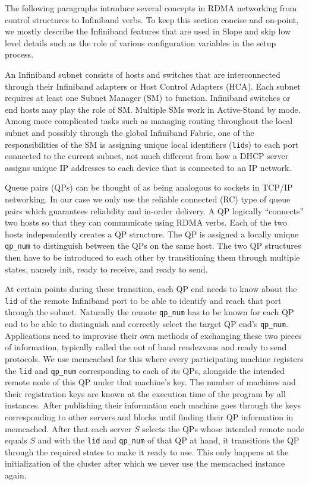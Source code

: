 The following paragraphs introduce several concepts in RDMA
networking from control structures to Infiniband verbs. To keep this section
concise and on-point, we mostly describe the Infiniband features that are used
in Slope and skip low level details such as the role of various configuration
variables in the setup process.

An Infiniband subnet consists of hosts and switches that are interconnected
through their Infiniband adapters or Host Control Adapters (HCA).
Each subnet requires at least one Subnet Manager (SM) to function.
Infiniband switches or end hosts may play the role of SM. Multiple SMs
work in Active-Stand by mode. Among more complicated tasks such as managing
routing throughout the local subnet and possibly through the global Infiniband
Fabric, one of the responsibilities of the SM is assigning unique local
identifiers (\texttt{lid}s) to each port connected to the current subnet, not much
different from how a DHCP server assigns unique IP addresses to each device
that is connected to an IP network.

Queue pairs (QPs) can be thought of as being analogous to sockets in TCP/IP
networking. In our case we only use the reliable connected (RC) type of queue
pairs which guarantees reliability and in-order delivery.
A QP logically ``connects'' two hosts so that they can communicate using
RDMA verbs. Each of the two hosts independently creates a QP structure. The
QP is assigned a locally unique \texttt{qp\_num} to distinguish between the
QPs on the same host. The two QP structures then have to be introduced to
each other by transitioning them through multiple states, namely init, ready to
receive, and ready to send.

At certain points during these transition, each
QP end needs to know about the \texttt{lid} of the remote Infiniband port to
be able to identify and reach that port through the subnet. Naturally the
remote \texttt{qp\_num} has to be known for each QP end to be able to
distinguish and correctly select the target QP end's \texttt{qp\_num}.
Applications need to improvise their own methods of exchanging these two
pieces of information, typically called the out of band rendezvous and ready to
send protocols. We use memcached for this where every participating machine
registers the \texttt{lid} and \texttt{qp\_num} corresponding to each of its
QPs, alongside the intended remote node of this QP under that machine's key.
The number of machines and their registration keys
are known at the execution time of the program by all instances. After
publishing their information each machine goes through the keys corresponding
to other servers and blocks until finding their QP information in memcached.
After that each server $S$ selects the QPs whose intended remote node equals
$S$ and with the \texttt{lid} and \texttt{qp\_num} of that QP at hand, it
transitions the QP through the required states to make it ready to use. This
only happens at the initialization of the cluster after which we never use
the memcached instance again.

